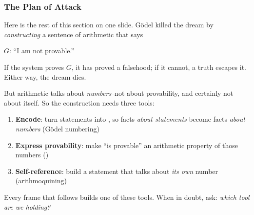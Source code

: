 \documentclass[aspectratio=169]{beamer}
\begin{document}
\begin{frame}[fragile]
  \frametitle{The Plan of Attack}

  Here is the rest of this section on one slide. G\"odel killed the
  dream by \textit{constructing} a sentence of arithmetic that says

  \begin{center}
    {\large $G$: \quad ``I am not provable.''}
  \end{center}

  If the system proves $G$, it has proved a falsehood; if it cannot,
  a truth escapes it. Either way, the dream dies.

  \pause
  \vspace{\fill}

  But arithmetic talks about \textit{numbers}--not about provability,
  and certainly not about itself. So the construction needs three
  tools:

  \begin{enumerate}
    \item \textbf{Encode}: turn statements into , so
      facts \textit{about statements} become facts \textit{about
      numbers} \hfill {\small (G\"odel numbering)}
    \item \textbf{Express provability}: make ``is provable'' an
      arithmetic property of those numbers \hfill {\small (\THM)}
    \item \textbf{Self-reference}: build a statement that talks
      about \textit{its own} number \hfill {\small (arithmoquining)}
  \end{enumerate}

  \pause
  \vspace{\fill}

  Every frame that follows builds one of these tools. When in doubt,
  ask: \textit{which tool are we holding?}
\end{frame}

\end{document}
